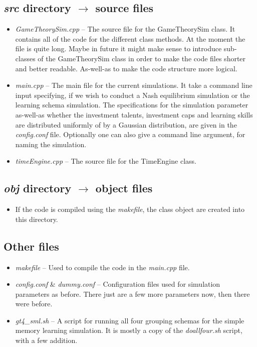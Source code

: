 \documentclass{article}
\begin{document}
\subsection{\emph{src} directory $\rightarrow$ source files}
\begin{itemize}

\item \emph{GameTheorySim.cpp} -- The source file for the GameTheorySim class. It contains all of the code for the different class methods. At the moment the file is quite long. Maybe in future it might make sense to introduce sub-classes of the GameTheorySim class in order to make the code files shorter and better readable. As-well-as to make the code structure more logical. 

\item \emph{main.cpp} -- The main file for the current simulations. It take a command line input specifying, if we wish to conduct a Nash equilibrium simulation or the learning schema simulation. The specifications for the simulation parameter as-well-as whether the investment talents, investment caps and learning skills are distributed uniformly of by a Gaussian distribution, are given in the \emph{config.conf} file. Optionally one can also give a command line argument, for naming the simulation. 

\item \emph{timeEngine.cpp} -- The source file for the TimeEngine class.  

\end{itemize}

\subsection{\emph{obj} directory $\rightarrow$ object files}

\begin{itemize}

\item If the code is compiled using the \emph{makefile}, the class object are created into this directory.  

\end{itemize}

\subsection{Other files}

\begin{itemize}

\item \emph{makefile} -- Used to compile the code in the \emph{main.cpp} file.   

\item \emph{config.conf} \& \emph{dummy.conf} -- Configuration files used for simulation parameters as before. There just are a few more parameters now, then there were before. 

\item \emph{gt4\_sml.sh} -- A script for running all four grouping schemas for the simple memory learning simulation. It is mostly a copy of the \emph{doallfour.sh} script, with a few addition. 

\end{itemize}
\end{document}

